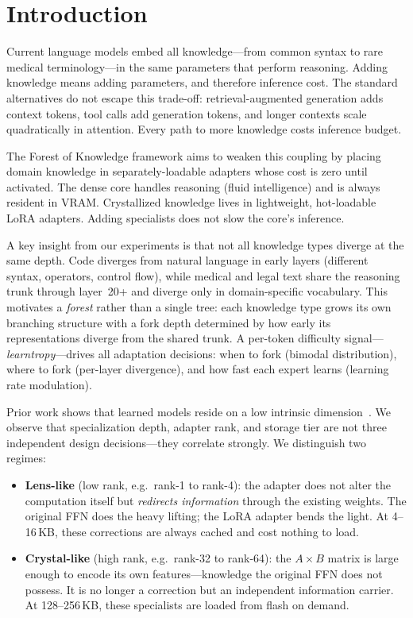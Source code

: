 \documentclass{article}
\newcommand{\tok}{Forest of Knowledge}
\begin{document}
\section{Introduction}
\label{sec:intro}

Current language models embed all knowledge---from common syntax to rare medical terminology---in the same parameters that perform reasoning. Adding knowledge means adding parameters, and therefore inference cost. The standard alternatives do not escape this trade-off: retrieval-augmented generation adds context tokens, tool calls add generation tokens, and longer contexts scale quadratically in attention. Every path to more knowledge costs inference budget.

The \tok{} framework aims to weaken this coupling by placing domain knowledge in separately-loadable adapters whose cost is zero until activated. The dense core handles reasoning (fluid intelligence) and is always resident in VRAM. Crystallized knowledge lives in lightweight, hot-loadable LoRA adapters. Adding specialists does not slow the core's inference.

A key insight from our experiments is that not all knowledge types diverge at the same depth. Code diverges from natural language in early layers (different syntax, operators, control flow), while medical and legal text share the reasoning trunk through layer~20+ and diverge only in domain-specific vocabulary. This motivates a \emph{forest} rather than a single tree: each knowledge type grows its own branching structure with a fork depth determined by how early its representations diverge from the shared trunk. A per-token difficulty signal---\emph{learntropy}---drives all adaptation decisions: when to fork (bimodal distribution), where to fork (per-layer divergence), and how fast each expert learns (learning rate modulation).

Prior work shows that learned models reside on a low intrinsic
dimension~\cite{li2018intrinsic,aghajanyan2021intrinsic}. We observe that
specialization depth, adapter rank, and storage tier are not three independent
design decisions---they correlate strongly. We distinguish two regimes:

\begin{itemize}[nosep,leftmargin=1em]
\item \textbf{Lens-like} (low rank, e.g.\ rank-1 to rank-4): the adapter does not alter the computation itself but \emph{redirects information} through the existing weights. The original FFN does the heavy lifting; the LoRA adapter bends the light. At 4--16\,KB, these corrections are always cached and cost nothing to load.
\item \textbf{Crystal-like} (high rank, e.g.\ rank-32 to rank-64): the $A \times B$ matrix is large enough to encode its own features---knowledge the original FFN does not possess. It is no longer a correction but an independent information carrier. At 128--256\,KB, these specialists are loaded from flash on demand.
\end{itemize}
\end{document}
